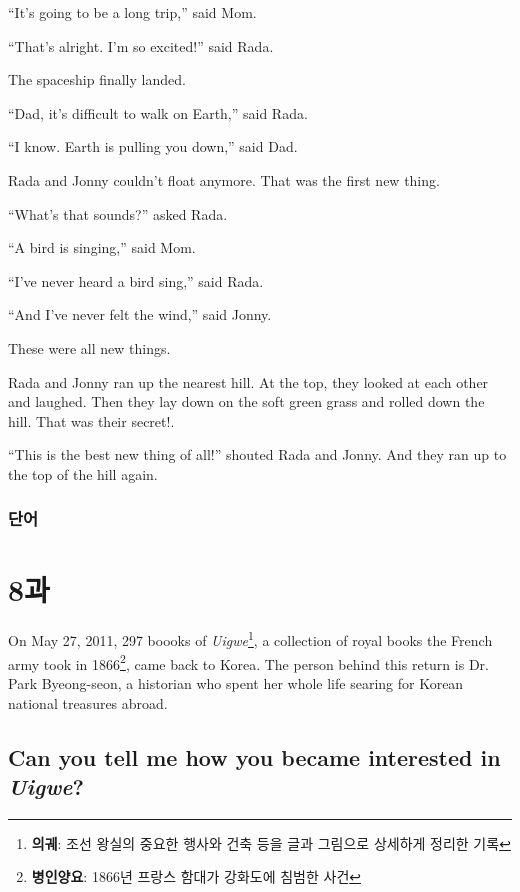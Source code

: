 \documentclass[9pt, a4paper]{oblivoir}
\begin{document}
    ``It's going to be a long trip,'' said Mom.
    
    ``That's alright. I'm so excited!'' said Rada. \newline

    The spaceship finally landed. 

    ``Dad, it's difficult to walk on Earth,'' said Rada.

    ``I know. Earth is pulling you down,'' said Dad.

    Rada and Jonny couldn't float anymore. That was the first new thing. 

    ``What's that sounds?'' asked Rada.

    ``A bird is singing,'' said Mom.

    ``I've never heard a bird sing,'' said Rada.

    ``And I've never felt the wind,'' said Jonny. 

    These were all new things. 

    Rada and Jonny ran up the nearest hill. At the top, they looked at each other and laughed.
    Then they lay down on the soft green grass and rolled down the hill. That was their secret!.

    ``This is the best new thing of all!'' shouted Rada and Jonny. And they ran up to the top of the hill again.

    \vspace*{4cm}
    \subsubsection*{단어}
    \newpage

    \section*{8과}

    On May 27, 2011, 297 boooks of \emph{Uigwe}\footnote{\textbf{의궤}: 조선 왕실의 중요한 행사와 건축 등을 글과 그림으로 상세하게 정리한 기록}, a collection of royal books the French army took in 1866\footnote{\textbf{병인양요}: 1866년 프랑스 함대가 강화도에 침범한 사건},  came back to Korea. 
    The person behind this return is Dr. Park Byeong-seon, a historian who spent her whole life searing for Korean national treasures abroad. 

    \subsection*{Can you tell me how you became interested in \emph{Uigwe}?}
\end{document}
